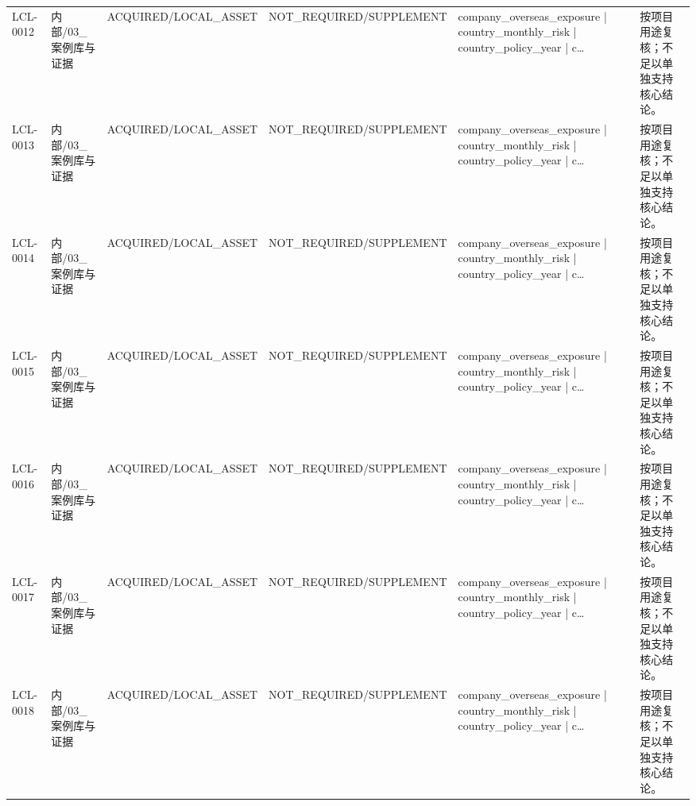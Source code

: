 \begin{landscape}
\begin{longtable}{p{1.8cm}p{2.6cm}p{2.6cm}p{2.6cm}p{4.8cm}p{7.2cm}}
LCL-0012 & 内部/\allowbreak{}03\_\allowbreak{}案例库与证据 & ACQUIRED/\allowbreak{}LOCAL\_\allowbreak{}ASSET & NOT\_\allowbreak{}REQUIRED/\allowbreak{}SUPPLEMENT & company\_\allowbreak{}overseas\_\allowbreak{}exposure | country\_\allowbreak{}monthly\_\allowbreak{}risk | country\_\allowbreak{}policy\_\allowbreak{}year | c… & 按项目用途复核；不足以单独支持核心结论。\\
LCL-0013 & 内部/\allowbreak{}03\_\allowbreak{}案例库与证据 & ACQUIRED/\allowbreak{}LOCAL\_\allowbreak{}ASSET & NOT\_\allowbreak{}REQUIRED/\allowbreak{}SUPPLEMENT & company\_\allowbreak{}overseas\_\allowbreak{}exposure | country\_\allowbreak{}monthly\_\allowbreak{}risk | country\_\allowbreak{}policy\_\allowbreak{}year | c… & 按项目用途复核；不足以单独支持核心结论。\\
LCL-0014 & 内部/\allowbreak{}03\_\allowbreak{}案例库与证据 & ACQUIRED/\allowbreak{}LOCAL\_\allowbreak{}ASSET & NOT\_\allowbreak{}REQUIRED/\allowbreak{}SUPPLEMENT & company\_\allowbreak{}overseas\_\allowbreak{}exposure | country\_\allowbreak{}monthly\_\allowbreak{}risk | country\_\allowbreak{}policy\_\allowbreak{}year | c… & 按项目用途复核；不足以单独支持核心结论。\\
LCL-0015 & 内部/\allowbreak{}03\_\allowbreak{}案例库与证据 & ACQUIRED/\allowbreak{}LOCAL\_\allowbreak{}ASSET & NOT\_\allowbreak{}REQUIRED/\allowbreak{}SUPPLEMENT & company\_\allowbreak{}overseas\_\allowbreak{}exposure | country\_\allowbreak{}monthly\_\allowbreak{}risk | country\_\allowbreak{}policy\_\allowbreak{}year | c… & 按项目用途复核；不足以单独支持核心结论。\\
LCL-0016 & 内部/\allowbreak{}03\_\allowbreak{}案例库与证据 & ACQUIRED/\allowbreak{}LOCAL\_\allowbreak{}ASSET & NOT\_\allowbreak{}REQUIRED/\allowbreak{}SUPPLEMENT & company\_\allowbreak{}overseas\_\allowbreak{}exposure | country\_\allowbreak{}monthly\_\allowbreak{}risk | country\_\allowbreak{}policy\_\allowbreak{}year | c… & 按项目用途复核；不足以单独支持核心结论。\\
LCL-0017 & 内部/\allowbreak{}03\_\allowbreak{}案例库与证据 & ACQUIRED/\allowbreak{}LOCAL\_\allowbreak{}ASSET & NOT\_\allowbreak{}REQUIRED/\allowbreak{}SUPPLEMENT & company\_\allowbreak{}overseas\_\allowbreak{}exposure | country\_\allowbreak{}monthly\_\allowbreak{}risk | country\_\allowbreak{}policy\_\allowbreak{}year | c… & 按项目用途复核；不足以单独支持核心结论。\\
LCL-0018 & 内部/\allowbreak{}03\_\allowbreak{}案例库与证据 & ACQUIRED/\allowbreak{}LOCAL\_\allowbreak{}ASSET & NOT\_\allowbreak{}REQUIRED/\allowbreak{}SUPPLEMENT & company\_\allowbreak{}overseas\_\allowbreak{}exposure | country\_\allowbreak{}monthly\_\allowbreak{}risk | country\_\allowbreak{}policy\_\allowbreak{}year | c… & 按项目用途复核；不足以单独支持核心结论。\\

\end{longtable}
\end{landscape}

